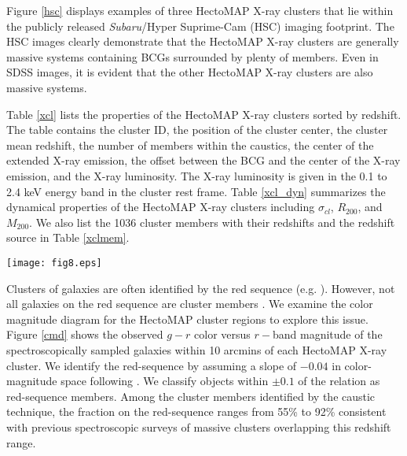 \documentclass[iop, apj]{emulateapj}
\begin{document}
Figure \ref{hsc} displays 
 examples of three HectoMAP X-ray clusters that lie within 
 the publicly released {\it Subaru}/Hyper Suprime-Cam (HSC) imaging footprint.
The HSC images clearly demonstrate that 
 the HectoMAP X-ray clusters are generally massive systems 
 containing BCGs surrounded by plenty of members. 
Even in SDSS images, 
 it is evident that the other HectoMAP X-ray clusters are also massive systems.

Table \ref{xcl} lists the properties of the HectoMAP X-ray clusters
 sorted by redshift. 
The table contains the cluster ID, the position of the cluster center,
 the cluster mean redshift, the number of members within the caustics,
 the center of the extended X-ray emission, 
 the offset between the BCG and the center of the X-ray emission, and 
 the X-ray luminosity. 
The X-ray luminosity is given in the 0.1 to 2.4 keV energy band in the cluster rest frame. 
Table \ref{xcl_dyn} summarizes 
 the dynamical properties of the HectoMAP X-ray clusters 
 including $\sigma_{cl}$, $R_{200}$, and $M_{200}$. 
We also list the 1036 cluster members with their redshifts and the redshift source in Table \ref{xclmem}. 
 
\begin{figure*}
\centering
\texttt{[image: fig8.eps]}
\caption{
$g-r$ vs. $r$ color-magnitude diagram of 
 the HectoMAP X-ray clusters sorted by redshifts. 
Red and gray circles show cluster members and spectroscopic targets
 within $10\arcmin$, respectively. 
Shaded regions mark the red-sequence (dashed line) $\pm 0.1$. 
$f_{rs, mem}$ shows the member fraction with respect to the 
 number of spectroscopic targets in the red-sequence. }
\label{cmd}
\end{figure*}
 
Clusters of galaxies are often identified by the red sequence 
 (e.g. \citealp{Gladders00, Rykoff14, Oguri17}). 
However, not all galaxies on the red sequence are cluster members \citep{Rines08, Sohn17}.  
We examine the color magnitude diagram for 
 the HectoMAP cluster regions to explore this issue.  
Figure \ref{cmd} shows the observed $g-r$ color versus $r-$band magnitude
 of the spectroscopically sampled galaxies 
 within 10 arcmins of each HectoMAP X-ray cluster.
We identify the red-sequence
 by assuming a slope of $-0.04$ in color-magnitude space 
 following \citet{Rines13}. 
We classify objects within $\pm 0.1$ of the relation 
 as red-sequence members. 
Among the cluster members identified by the caustic technique, 
 the fraction on the red-sequence ranges from 55\% to 92\%
 consistent with previous spectroscopic surveys of massive clusters overlapping this redshift range.
\end{document}
